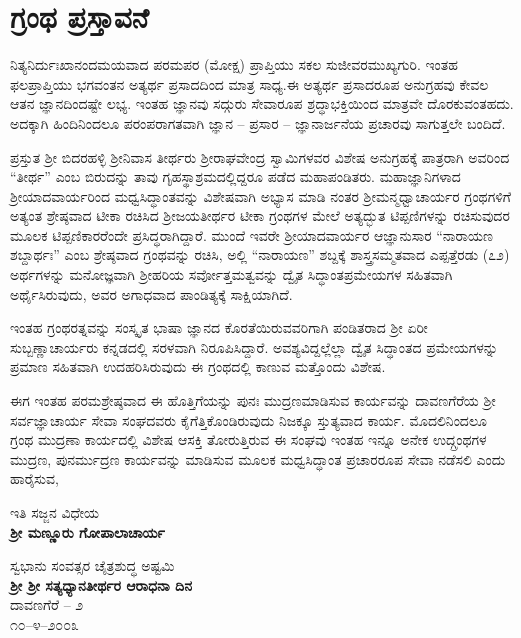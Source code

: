 

\begin{center}
\end{center}

\chapter*{ಗ್ರಂಥ ಪ್ರಸ್ತಾವನೆ}

\vskip -10pt

ನಿತ್ಯನಿರ್ದುಃಖಾನಂದಮಯವಾದ ಪರಮಪರ (ಮೋಕ್ಷ) ಪ್ರಾಪ್ತಿಯು ಸಕಲ ಸುಜೀವರ\break ಮುಖ್ಯಗುರಿ. ಇಂತಹ ಫಲಪ್ರಾಪ್ತಿಯು ಭಗವಂತನ ಅತ್ಯರ್ಥ ಪ್ರಸಾದದಿಂದ ಮಾತ್ರ ಸಾಧ್ಯ.\break ಈ ಅತ್ಯರ್ಥ ಪ್ರಸಾದರೂಪ ಅನುಗ್ರಹವು ಕೇವಲ ಆತನ ಜ್ಞಾನದಿಂದಷ್ಟೇ ಲಭ್ಯ. ಇಂತಹ ಜ್ಞಾನವು ಸದ್ಗುರು ಸೇವಾರೂಪ ಶ್ರದ್ಧಾಭಕ್ತಿಯಿಂದ ಮಾತ್ರವೇ ದೊರಕುವಂತಹದು. ಅದಕ್ಕಾಗಿ ಹಿಂದಿನಿಂದಲೂ ಪರಂಪರಾಗತವಾಗಿ ಜ್ಞಾನ – ಪ್ರಸಾರ – ಜ್ಞಾನಾರ್ಜನೆಯ ಪ್ರಚಾರವು ಸಾಗು\-ತ್ತಲೇ ಬಂದಿದೆ.

\vskip 4pt

ಪ್ರಸ್ತುತ ಶ‍್ರೀ ಬಿದರಹಳ್ಳಿ ಶ‍್ರೀನಿವಾಸ ತೀರ್ಥರು ಶ‍್ರೀರಾಘವೇಂದ್ರ ಸ್ವಾಮಿಗಳವರ ವಿಶೇಷ ಅನುಗ್ರಹಕ್ಕೆ ಪಾತ್ರರಾಗಿ ಅವರಿಂದ “ತೀರ್ಥ” ಎಂಬ ಬಿರುದನ್ನು ತಾವು ಗೃಹಸ್ಥಾ\-ಶ್ರಮದಲ್ಲಿದ್ದರೂ ಪಡೆದ ಮಹಾಪಂಡಿತರು. ಮಹಾಜ್ಞಾನಿಗಳಾದ ಶ‍್ರೀಯಾದವಾರ್ಯರಿಂದ ಮಧ್ವಸಿದ್ಧಾಂತವನ್ನು ವಿಶೇಷವಾಗಿ ಅಭ್ಯಾಸ ಮಾಡಿ ನಂತರ ಶ‍್ರೀಮನ್ಮಧ್ವಾಚಾರ್ಯರ ಗ್ರಂಥಗಳಿಗೆ ಅತ್ಯಂತ ಶ್ರೇಷ್ಠವಾದ ಟೀಕಾ ರಚಿಸಿದ ಶ‍್ರೀಜಯತೀರ್ಥರ ಟೀಕಾ ಗ್ರಂಥಗಳ ಮೇಲೆ ಅತ್ಯದ್ಭುತ ಟಿಪ್ಪಣಿಗಳನ್ನು ರಚಿಸುವುದರ ಮೂಲಕ ಟಿಪ್ಪಣಿಕಾರರೆಂದೇ ಪ್ರಸಿದ್ಧರಾಗಿದ್ದಾರೆ. ಮುಂದೆ ಇವರೇ ಶ‍್ರೀಯಾದವಾರ್ಯರ ಆಜ್ಞಾನುಸಾರ “ನಾರಾಯಣ ಶಬ್ದಾರ್ಥಃ” ಎಂಬ ಶ್ರೇಷ್ಠವಾದ ಗ್ರಂಥವನ್ನು ರಚಿಸಿ, ಅಲ್ಲಿ “ನಾರಾಯಣ” ಶಬ್ದಕ್ಕೆ ಶಾಸ್ತ್ರಸಮ್ಮತವಾದ ಎಪ್ಪತ್ತೆರಡು (೭೨) ಅರ್ಥಗಳನ್ನು ಮನೋಜ್ಞವಾಗಿ ಶ‍್ರೀಹರಿಯ ಸರ್ವೋತ್ತಮತ್ವವನ್ನು ದ್ವೈತ ಸಿದ್ಧಾಂತ\break ಪ್ರಮೇಯಗಳ ಸಹಿತವಾಗಿ ಅರ್ಥೈಸಿರುವುದು, ಅವರ ಅಗಾಧವಾದ ಪಾಂಡಿತ್ಯಕ್ಕೆ ಸಾಕ್ಷಿ\-ಯಾಗಿದೆ.

\vskip 4pt

ಇಂತಹ ಗ್ರಂಥರತ್ನವನ್ನು ಸಂಸ್ಕೃತ ಭಾಷಾ ಜ್ಞಾನದ ಕೊರತೆಯಿರುವವರಿಗಾಗಿ ಪಂಡಿತರಾದ ಶ‍್ರೀ ಏರೀ ಸುಬ್ಬಣ್ಣಾಚಾರ್ಯರು ಕನ್ನಡದಲ್ಲಿ ಸರಳವಾಗಿ ನಿರೂಪಿಸಿದ್ದಾರೆ. ಅವಶ್ಯವಿದ್ದಲ್ಲೆಲ್ಲಾ ದ್ವೈತ ಸಿದ್ಧಾಂತದ ಪ್ರಮೇಯಗಳನ್ನು ಪ್ರಮಾಣ ಸಹಿತವಾಗಿ ಉದಹರಿಸಿರುವುದು ಈ ಗ್ರಂಥದಲ್ಲಿ ಕಾಣುವ ಮತ್ತೊಂದು ವಿಶೇಷ.

ಈಗ ಇಂತಹ ಪರಮಶ್ರೇಷ್ಠವಾದ ಈ ಹೊತ್ತಿಗೆಯನ್ನು ಪುನಃ ಮುದ್ರಣಮಾಡಿಸುವ ಕಾರ್ಯವನ್ನು ದಾವಣಗೆರೆಯ ಶ‍್ರೀ ಸರ್ವಜ್ಞಾಚಾರ್ಯ ಸೇವಾ ಸಂಘದವರು ಕೈಗೆತ್ತಿಕೊಂಡಿರುವುದು ನಿಜಕ್ಕೂ ಸ್ತುತ್ಯವಾದ ಕಾರ್ಯ. ಮೊದಲಿನಿಂದಲೂ ಗ್ರಂಥ ಮುದ್ರಣಾ ಕಾರ್ಯದಲ್ಲಿ ವಿಶೇಷ ಆಸಕ್ತಿ ತೋರುತ್ತಿರುವ ಈ ಸಂಘವು ಇಂತಹ ಇನ್ನೂ ಅನೇಕ ಉದ್ಗ್ರಂಥಗಳ ಮುದ್ರಣ, ಪುನರ್ಮುದ್ರಣ ಕಾರ್ಯವನ್ನು ಮಾಡಿಸುವ ಮೂಲಕ ಮಧ್ವಸಿದ್ಧಾಂತ ಪ್ರಚಾರರೂಪ ಸೇವಾ ನಡೆಸಲಿ ಎಂದು ಹಾರೈಸುವ,

\begin{flushright}
ಇತಿ ಸಜ್ಜನ ವಿಧೇಯ\\\textbf{ಶ‍್ರೀ ಮಣ್ಣೂರು ಗೋಪಾಲಾಚಾರ್ಯ}
\end{flushright}

\noindent
ಸ್ವಭಾನು ಸಂವತ್ಸರ ಚೈತ್ರಶುದ್ಧ ಅಷ್ಟಮಿ\\\textbf{ಶ‍್ರೀ ಶ‍್ರೀ ಸತ್ಯಧ್ಯಾನತೀರ್ಥರ ಆರಾಧನಾ ದಿನ}\\ ದಾವಣಗೆರೆ – ೨\\ ೧೦–೪–೨೦೦೩

